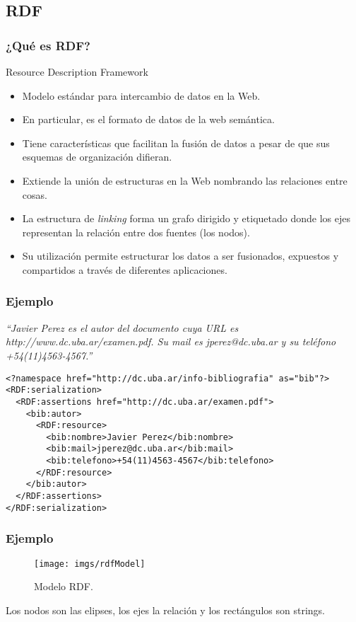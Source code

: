 \documentclass{beamer}
\begin{document}
\subsection{RDF}
\begin{frame}[fragile] %
\frametitle{¿Qué es RDF?}
\begin{block}{Resource Description Framework}
\begin{itemize}
\item<1-> Modelo estándar para intercambio de datos en la Web.
\item<2-> En particular, es el formato de datos de la web semántica.
\item<3-> Tiene características que facilitan la fusión de datos a pesar de que sus esquemas de organización difieran.
\item<4-> Extiende la unión de estructuras en la Web nombrando las relaciones entre cosas.
\item<5-> La estructura de \textit{linking} forma un grafo dirigido y etiquetado donde los ejes representan la relación entre dos fuentes (los nodos).
\item<5-> Su utilización permite estructurar los datos a ser fusionados, expuestos y compartidos a través de diferentes aplicaciones.
\end{itemize}
\end{block}
\end{frame}

\begin{frame}[fragile]
\frametitle{Ejemplo}
\textit{``Javier Perez es el autor del documento cuya URL es http://www.dc.uba.ar/examen.pdf. Su mail es jperez@dc.uba.ar y su teléfono +54(11)4563-4567.''}
\begin{verbatim}
<?namespace href="http://dc.uba.ar/info-bibliografia" as="bib"?> 
<RDF:serialization> 
  <RDF:assertions href="http://dc.uba.ar/examen.pdf"> 
    <bib:autor> 
      <RDF:resource> 
        <bib:nombre>Javier Perez</bib:nombre> 
        <bib:mail>jperez@dc.uba.ar</bib:mail> 
        <bib:telefono>+54(11)4563-4567</bib:telefono> 
      </RDF:resource> 
    </bib:autor> 
  </RDF:assertions> 
</RDF:serialization>

\end{verbatim}
\end{frame}

\begin{frame}[fragile]
\frametitle{Ejemplo} 
\begin{center}
\begin{figure}[H] %
\texttt{[image: imgs/rdfModel]}
\caption{Modelo RDF.}
\end{figure}
Los nodos son las elipses, los ejes la relación y los rectángulos son strings.
\end{center}
\end{frame}
\end{document}
